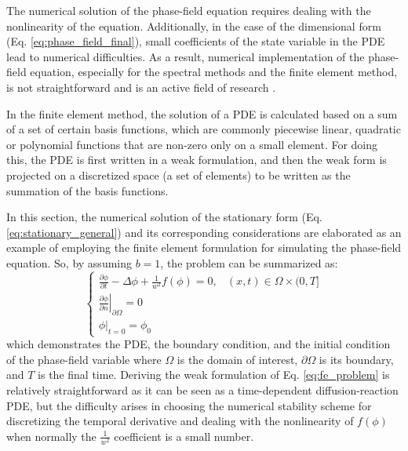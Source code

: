 The numerical solution of the phase-field equation requires dealing with the nonlinearity of the equation. Additionally, in the case of the dimensional form (Eq. \ref{eq:phase_field_final}), small coefficients of the state variable in the {PDE} lead to numerical difficulties. As a result, numerical implementation of the phase-field equation, especially for the spectral methods and the finite element method, is not straightforward and is an active field of research \cite{Shen2010,Abboud2019}.

In the finite element method, the solution of a {PDE} is calculated based on a sum of a set of certain basis functions, which are commonly piecewise linear, quadratic or polynomial functions that are non-zero only on a small element. For doing this, the {PDE} is first written in a weak formulation, and then the weak form is projected on a discretized space (a set of elements) to be written as the summation of the basis functions.

In this section, the numerical solution of the stationary form (Eq. \ref{eq:stationary_general}) and its corresponding considerations are elaborated as an example of employing the finite element formulation for simulating the phase-field equation. So, by assuming $b=1$, the problem can be summarized as:
\begin{equation} \label{eq:fe_problem}
\left\{\begin{array}{ll}
\frac{\partial \phi}{\partial t}-\Delta \phi+\frac{1}{w^{2}} f(\phi)=0, & (x, t) \in \Omega \times(0, T] \\
\left.\frac{\partial \phi}{\partial n} \right|_{\partial \Omega}=0 \\
\left.\phi\right|_{t=0}=\phi_{0}
\end{array}\right.
\end{equation}
which demonstrates the {PDE}, the boundary condition, and the initial condition of the phase-field variable where $\Omega$ is the domain of interest, $\partial \Omega$ is its boundary, and $T$ is the final time. Deriving the weak formulation of Eq. \ref{eq:fe_problem} is relatively straightforward as it can be seen as a time-dependent diffusion-reaction {PDE}, but the difficulty arises in choosing the numerical stability scheme for discretizing the temporal derivative and dealing with the nonlinearity of $f(\phi)$ when normally the $\frac{1}{w^{2}}$ coefficient is a small number.

